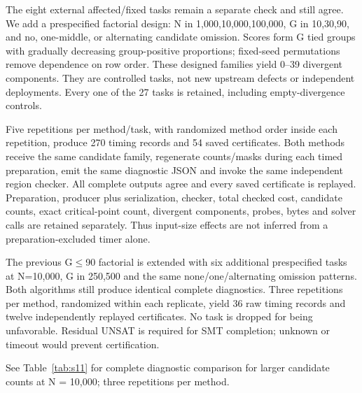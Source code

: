 \documentclass[11pt,a4paper]{article}
\theoremstyle{plain}
\theoremstyle{definition}
\theoremstyle{remark}
\begin{document}
The eight external affected/fixed tasks remain a separate check and still agree. We add a prespecified factorial design: N in {1{,}000,10{,}000,100{,}000}, G in {10,30,90}, and no, one-middle, or alternating candidate omission. Scores form G tied groups with gradually decreasing group-positive proportions; fixed-seed permutations remove dependence on row order. These designed families yield 0--39 divergent components. They are controlled tasks, not new upstream defects or independent deployments. Every one of the 27 tasks is retained, including empty-divergence controls.

Five repetitions per method/task, with randomized method order inside each repetition, produce 270 timing records and 54 saved certificates. Both methods receive the same candidate family, regenerate counts/masks during each timed preparation, emit the same diagnostic JSON and invoke the same independent region checker. All complete outputs agree and every saved certificate is replayed. Preparation, producer plus serialization, checker, total checked cost, candidate counts, exact critical-point count, divergent components, probes, bytes and solver calls are retained separately. Thus input-size effects are not inferred from a preparation-excluded timer alone.

The previous G$\le$90 factorial is extended with six additional prespecified tasks at N=10{,}000, G in {250,500} and the same none/one/alternating omission patterns. Both algorithms still produce identical complete diagnostics. Three repetitions per method, randomized within each replicate, yield 36 raw timing records and twelve independently replayed certificates. No task is dropped for being unfavorable. Residual UNSAT is required for SMT completion; unknown or timeout would prevent certification.

See Table~\ref{tab:s11} for complete diagnostic comparison for larger candidate counts at N = 10{,}000; three repetitions per method.
\end{document}
